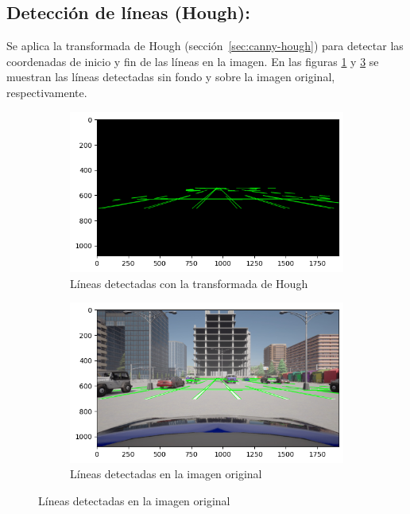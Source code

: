 \subsection{Detección de líneas (Hough):} \label{sec:hough}

Se aplica la transformada de Hough \cite{ballard1981hough} (sección~\ref{sec:canny-hough}) para detectar las coordenadas de inicio y fin de las líneas en la imagen.
En las figuras \ref{fig:hough} y \ref{fig:lines} se muestran las líneas detectadas sin fondo y sobre la imagen original, respectivamente.
\begin{figure}[!ht]
    \begin{subfigure}{0.5\textwidth}
        \includegraphics[width=\textwidth]{img/reticule/hough2}
        \caption{Líneas detectadas con la transformada de Hough}
        \label{fig:hough}
    \end{subfigure}
    \begin{subfigure}{0.5\textwidth}
        \includegraphics[width=\textwidth]{img/reticule/hough}
        \caption{Líneas detectadas en la imagen original}
        \label{fig:lines}
    \end{subfigure}
\end{figure}

